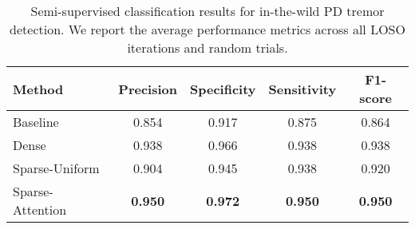 \documentclass[journal,twoside,web]{ieeecolor}
\begin{document}
\begin{table}[!h]
	\centering
	\caption{Semi-supervised classification results for in-the-wild PD
          tremor detection. We report the average performance metrics across all
          LOSO iterations and random trials.
              }
	\begin{tabular}{l|c*{3}{c}}\toprule
		\textbf{Method} & \textbf{Precision} & \textbf{Specificity} &
		\textbf{Sensitivity} & \textbf{F1-score} \\\midrule
		Baseline \cite{alpapado2019tremor} & 0.854 & 0.917 & 0.875 & 0.864 \\ \midrule
		Dense & 0.938 & 0.966 & 0.938 & 0.938\\ 
		Sparse-Uniform & 0.904 & 0.945 & 0.938 & 0.920\\ 
		
		Sparse-Attention & \textbf{0.950} &
		\textbf{0.972} & \textbf{0.950} & \textbf{0.950}\\		
		\bottomrule
	\end{tabular}
	
	\label{tab:results_tremor}
\end{table}
\end{document}
